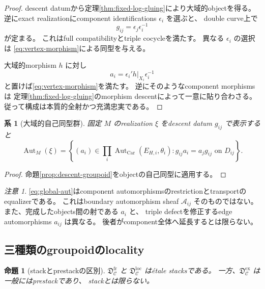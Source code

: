\documentclass[uplatex,dvipdfmx,11pt]{jsarticle}
\numberwithin{equation}{section}
\theoremstyle{plain}
\newtheorem{proposition}[theorem]{命題}
\newtheorem{corollary}[theorem]{系}
\theoremstyle{definition}
\theoremstyle{remark}
\newtheorem{remark}[theorem]{注意}
\DeclareMathOperator{\Aut}{Aut}
\newcommand{\Car}{\mathrm{Car}}
\newcommand{\calC}{\mathcal C}
\newcommand{\calD}{\mathfrak D}
\begin{document}
\begin{proof}
descent datumから定理\ref{thm:fixed-log-gluing}により大域的objectを得る。
逆にexact realizationにcomponent identifications \(\epsilon_i\) を選ぶと、
double curve上で
\[
g_{ij}=\epsilon_j\epsilon_i^{-1}
\]
が定まる。
これはfull compatibilityとtriple cocycleを満たす。
異なる \(\epsilon_i\) の選択は
\eqref{eq:vertex-morphism}による同型を与える。

大域的morphism \(h\) に対し
\[
a_i=\epsilon_i' h|_{X_i}\epsilon_i^{-1}
\]
と置けば\eqref{eq:vertex-morphism}を満たす。
逆にそのようなcomponent morphismsは
定理\ref{thm:fixed-log-gluing}のmorphism descentによって一意に貼り合わさる。
従って構成は本質的全射かつ充満忠実である。
\end{proof}

\begin{corollary}[大域的自己同型群]
\label{cor:global-aut}
固定 \(M\) のrealization \(\xi\) をdescent datum \(g_{ij}\) で表示すると
\begin{equation}
\label{eq:global-aut}
\Aut_M(\xi)
=
\left\{
(a_i)\in\prod_i\Aut_{\Car}(E_{H,i},\theta_i):
g_{ij}a_i=a_jg_{ij}\text{ on }D_{ij}
\right\}.
\end{equation}
\end{corollary}

\begin{proof}
命題\ref{prop:descent-groupoid}をobjectの自己同型に適用する。
\end{proof}

\begin{remark}
\label{rem:edge-vs-vertex}
\eqref{eq:global-aut}はcomponent automorphismsのrestrictionとtransportのequalizerである。
これはboundary automorphism sheaf \(\mathscr A_{ij}\) そのものではない。
また、完成したobjects間の射である \(a_i\) と、
triple defectを修正するedge automorphisms \(a_{ij}\) は異なる。
後者がcomponent全体へ延長するとは限らない。
\end{remark}

\subsection{三種類のgroupoidのlocality}

\begin{proposition}[stackとprestackの区別]
\label{prop:stack-properties}
\(\calD_{\calC}^{\mathrm{fr}}\) と
\(\calD_{\calC}^{\mathrm{loc}}\) はétale stacksである。
一方、\(\calD_{\calC}^{\mathrm{ex}}\) は一般にはprestackであり、
stackとは限らない。
\end{proposition}
\end{document}
